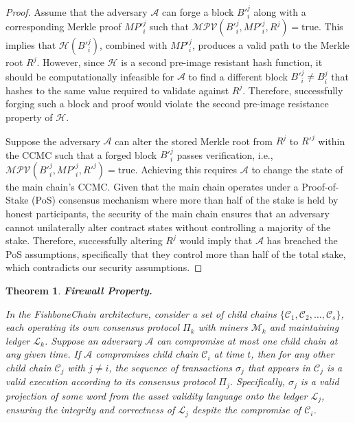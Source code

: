 \documentclass[10pt,journal]{IEEEtran}
\newtheorem{theorem}{Theorem}
\begin{document}
\begin{proof}
    Assume that the adversary $\mathcal{A}$ can forge a block $B'^j_i$ along with a corresponding Merkle proof $MP'^j_i$ such that $\mathcal{MPV}(B'^j_i, MP'^j_i, R^j) = \text{true}$. This implies that $\mathcal{H}(B'^j_i)$, combined with $MP'^j_i$, produces a valid path to the Merkle root $R^j$. However, since $\mathcal{H}$ is a second pre-image resistant hash function, it should be computationally infeasible for $\mathcal{A}$ to find a different block $B'^j_i \neq B^j_i$ that hashes to the same value required to validate against $R^j$. Therefore, successfully forging such a block and proof would violate the second pre-image resistance property of $\mathcal{H}$.

    Suppose the adversary $\mathcal{A}$ can alter the stored Merkle root from $R^j$ to $R'^j$ within the CCMC such that a forged block $B'^j_i$ passes verification, i.e., $\mathcal{MPV}(B'^j_i, MP'^j_i, R'^j) = \text{true}$. Achieving this requires $\mathcal{A}$ to change the state of the main chain's CCMC. Given that the main chain operates under a Proof-of-Stake (PoS) consensus mechanism where more than half of the stake is held by honest participants, the security of the main chain ensures that an adversary cannot unilaterally alter contract states without controlling a majority of the stake. Therefore, successfully altering $R^j$ would imply that $\mathcal{A}$ has breached the PoS assumptions, specifically that they control more than half of the total stake, which contradicts our security assumptions.
\end{proof}

\begin{theorem}\label{thm_child_chain_firewall}
\textbf{Firewall Property.}

In the FishboneChain architecture, consider a set of child chains $\{\mathcal{C}_1, \mathcal{C}_2, \dots, \mathcal{C}_s\}$, each operating its own consensus protocol $\Pi_k$ with miners $\mathcal{M}_k$ and maintaining ledger $\mathcal{L}_k$. Suppose an adversary $\mathcal{A}$ can compromise at most one child chain at any given time. If $\mathcal{A}$ compromises child chain $\mathcal{C}_i$ at time $t$, then for any other child chain $\mathcal{C}_j$ with $j \ne i$, the sequence of transactions $\sigma_j$ that appears in $\mathcal{C}_j$ is a valid execution according to its consensus protocol $\Pi_j$. Specifically, $\sigma_j$ is a valid projection of some word from the asset validity language onto the ledger $\mathcal{L}_j$, ensuring the integrity and correctness of $\mathcal{L}_j$ despite the compromise of $\mathcal{C}_i$.
\end{theorem}
\end{document}
